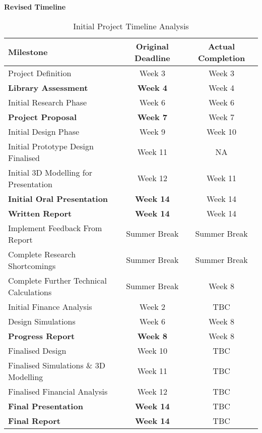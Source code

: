 \newpage
\textbf{Revised Timeline}

\begin{table}[H]
	\centering
	\begin{tabular}{||p{5cm} c c||} 
		\hline
		\textbf{Milestone} & \textbf{Original Deadline} & \textbf{Actual Completion} \\ [0.5ex] 
		\hline\hline
		Project Definition 							& Week 3 			& Week 3\\ 
		\textbf{Library Assessment} 				& \textbf{Week 4} 	& Week 4\\
		Initial Research Phase 						& Week 6 			& Week 6\\
		\textbf{Project Proposal} 					& \textbf{Week 7} 	& Week 7\\
		Initial Design Phase 						& Week 9			& Week 10\\
		Initial Prototype Design Finalised 			& Week 11 			& NA\\
		Initial 3D Modelling for Presentation 		& Week 12 			& Week 11\\ 
		\textbf{Initial Oral Presentation} 			& \textbf{Week 14} 	& Week 14\\
		\textbf{Written Report} 					& \textbf{Week 14} 	& Week 14\\ 
		Implement Feedback From Report 				& Summer Break 		& Summer Break \\
		Complete Research Shortcomings 				& Summer Break 		& Summer Break \\
		Complete Further Technical Calculations 	& Summer Break 		& Week 8 \\
		Initial Finance Analysis 					& Week 2 			& TBC \\
		Design Simulations 							& Week 6 			& Week 8 \\ 
		\textbf{Progress Report} 					& \textbf{Week 8} 	& Week 8 \\
		Finalised Design 							& Week 10 			& TBC \\
		Finalised Simulations \& 3D Modelling 		& Week 11 			& TBC \\
		Finalised Financial Analysis 				& Week 12 			& TBC \\ 
		\textbf{Final Presentation} 				& \textbf{Week 14} 	& TBC\\
		\textbf{Final Report} 						& \textbf{Week 14} 	& TBC\\ [1ex] 
		\hline
	\end{tabular}
	\caption{Initial Project Timeline Analysis}
	\label{table:timeline_revised}
\end{table}      



